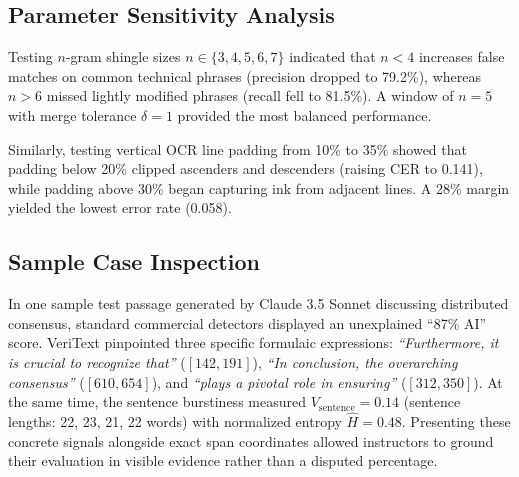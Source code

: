 \documentclass[conference]{IEEEtran}
\begin{document}
\subsection{Parameter Sensitivity Analysis}
Testing $n$-gram shingle sizes $n \in \{3, 4, 5, 6, 7\}$ indicated that $n < 4$ increases false matches on common technical phrases (precision dropped to 79.2\%), whereas $n > 6$ missed lightly modified phrases (recall fell to 81.5\%). A window of $n = 5$ with merge tolerance $\delta = 1$ provided the most balanced performance.

Similarly, testing vertical OCR line padding from 10\% to 35\% showed that padding below 20\% clipped ascenders and descenders (raising CER to 0.141), while padding above 30\% began capturing ink from adjacent lines. A 28\% margin yielded the lowest error rate (0.058).

\begin{table}[htbp]
\caption{Qualitative Feature Matrix of Compared Approaches}
\label{tab:qualitative}
\begin{center}
\end{center}
\end{table}

\subsection{Sample Case Inspection}
In one sample test passage generated by Claude 3.5 Sonnet discussing distributed consensus, standard commercial detectors displayed an unexplained ``87\% AI'' score. VeriText pinpointed three specific formulaic expressions: \textit{``Furthermore, it is crucial to recognize that''} ($[142, 191]$), \textit{``In conclusion, the overarching consensus''} ($[610, 654]$), and \textit{``plays a pivotal role in ensuring''} ($[312, 350]$). At the same time, the sentence burstiness measured $V_{\text{sentence}} = 0.14$ (sentence lengths: 22, 23, 21, 22 words) with normalized entropy $\hat{H} = 0.48$. Presenting these concrete signals alongside exact span coordinates allowed instructors to ground their evaluation in visible evidence rather than a disputed percentage.
\end{document}
